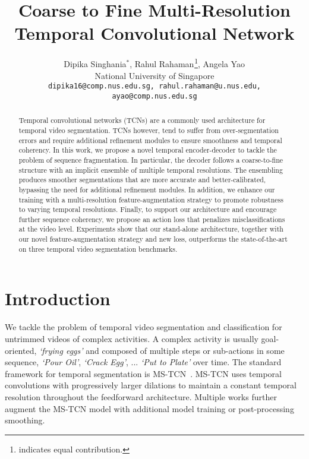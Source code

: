 \documentclass[10pt,twocolumn,letterpaper]{article}
\begin{document}
\title{Coarse to Fine Multi-Resolution Temporal Convolutional Network}
\author{
Dipika Singhania$^{*}$, Rahul Rahaman$^{}$\thanks{ indicates equal contribution. }, Angela Yao$^{}$\\
${}$National University of Singapore\\
{\tt\small dipika16@comp.nus.edu.sg, rahul.rahaman@u.nus.edu, ayao@comp.nus.edu.sg}
}




\maketitle
\ificcvfinal\thispagestyle{empty}\fi

\begin{abstract}
    Temporal convolutional networks (TCNs) are a commonly used architecture for temporal video segmentation.  TCNs however, tend to suffer from over-segmentation errors and require additional refinement modules to ensure smoothness and temporal coherency. In this work, we propose a novel temporal encoder-decoder to tackle the problem of sequence fragmentation.  In particular, the decoder follows a coarse-to-fine structure with an implicit ensemble of multiple temporal resolutions.  The ensembling produces smoother segmentations that are more accurate and better-calibrated, bypassing the need for additional refinement modules. In addition, we enhance our training with a multi-resolution feature-augmentation strategy to promote robustness to varying temporal resolutions.  Finally, to support our architecture and encourage further sequence coherency, we propose an action loss that penalizes misclassifications at the video level. Experiments show that our stand-alone architecture, together with our novel feature-augmentation strategy and new loss, outperforms the state-of-the-art on three temporal video segmentation benchmarks. 
\end{abstract}

\section{Introduction}\label{sec:introduction}


We tackle the problem of temporal video segmentation and classification for untrimmed videos of complex activities. A complex activity is usually goal-oriented, \eg \emph{`frying eggs'} and composed of multiple steps or sub-actions in some sequence, \eg \emph{`Pour Oil'}, \emph{`Crack Egg'}, ... 
\emph{`Put to Plate'} over time.  The standard framework for temporal segmentation is MS-TCN~\cite{li2020ms, farha2019ms}. MS-TCN uses
temporal convolutions with progressively larger dilations to maintain a constant temporal resolution throughout the feedforward architecture. Multiple works further augment the MS-TCN model \cite{wang2020boundary, wang2020gated} with additional model training or post-processing smoothing. 
\end{document}
